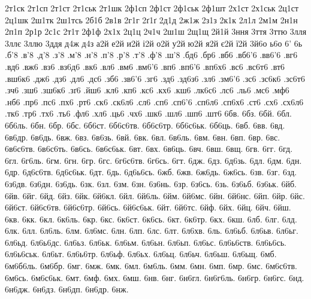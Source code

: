 {2т1ск 2т1сп 2т1ст 2т1ськ 2т1шк 2ф1сп 2ф1ст 2ф1ськ 
2ф1шт 2х1ст 2х1ськ 2ц1ст 2ц1шк 2ш1тк 2ш1тсь 
2б1б 2в1в 2г1г 2ґ1ґ 2д1д 2ж1ж 2з1з 2к1к 
2л1л 2м1м 2н1н 2п1п 2р1р 2с1с 2т1т 2ф1ф 
2х1х 2ц1ц 2ч1ч 2ш1ш 2щ1щ 2й1й 
3ння 3ття 3ттю 3лля 3ллє 3ллю 3ддя 
д4ж д4з 
а2й е2й и2й і2й о2й у2й ю2й я2й є2й ї2й 3й6о 
ь6о 6' 6ь 
.б'8 .в'8 .д'8 .з'8 .м'8 .н'8 .п'8 .р'8 
.т'8 .ф'8 .ш'8 .бд6 .бр6 .вб6 .вб6'6 .вв6'6 
.вг6 .вд6 .вж6 .вз6 .вз6д6 .вк6 .вл6 .вм6 
.вм6'6 .вп6 .вп6'6 .вп6х6 .вс6 .вс6т6 .вт6 .вш6к6 
.дж6 .дз6 .дл6 .дс6 .зб6 .зв6'6 .зг6 .зд6 
.зд6з6 .зл6 .зм6'6 .зс6 .зс6к6 .зс6т6 .зч6 .зш6 
.зш6к6 .зґ6 .йш6 .кл6 .кп6 .кс6 .кх6 .кш6 
.лк6с6 .лс6 .ль6 .мс6 .мф6 .нб6 .пр6 .пс6 
.пх6 .рт6 .ск6 .ск6л6 .сл6 .сп6 .сп6'6 .сп6л6 
.сп6х6 .ст6 .сх6 .сх6л6 .тк6 .тр6 .тх6 .ть6 
.фл6 .хл6 .ць6 .чх6 .шк6 .шл6 .шп6 .шт6 
6бв. 6бз. 6бй. 6бл. 6б6ль. 6бн. 6бр. 6бс. 
6б6ст. 6б6с6тв. 6б6с6тр. 6б6с6ьк. 6б6ць. 6вб. 6вв. 6вд. 
6в6др. 6в6дь. 6вж. 6вз. 6в6зь. 6вй. 6вк. 6вл. 
6в6ль. 6вм. 6вн. 6вп. 6вр. 6вс. 6в6с6тв. 6в6с6ть. 
6в6сь. 6в6с6ьк. 6вт. 6вх. 6в6ць. 6вч. 6вш. 6вщ. 
6гв. 6гг. 6гд. 6гл. 6г6ль. 6гм. 6гн. 6гр. 
6гс. 6г6с6тв. 6г6сь. 6гт. 6дж. 6дз. 6д6зь. 6дл. 
6дм. 6дн. 6др. 6д6с6тв. 6д6с6ьк. 6дт. 6дь. 6д6ь6сь. 
6жб. 6жв. 6ж6дь. 6ж6сь. 6зв. 6зг. 6зд. 6з6дв. 
6з6дн. 6з6дь. 6зк. 6зл. 6зм. 6зн. 6з6нь. 6зр. 
6з6сь. 6зь. 6з6ьб. 6з6ьк. 6йб. 6йв. 6йг. 6йд. 
6йз. 6йк. 6й6кл. 6йл. 6й6ль. 6йм. 6й6мс. 6йн. 
6й6нс. 6йп. 6йр. 6йс. 6й6ст. 6й6с6тв. 6й6с6тр. 6й6сь. 
6й6с6ьк. 6йт. 6й6тс. 6йф. 6йх. 6йц. 6йч. 6йш. 
6кв. 6кк. 6кл. 6к6ль. 6кр. 6кс. 6к6ст. 6к6сь. 
6кт. 6к6тр. 6кх. 6кш. 6лб. 6лг. 6лд. 6лк. 
6лл. 6л6ль. 6лм. 6л6мс. 6лн. 6лп. 6лс. 6лт. 
6л6хв. 6ль. 6л6ьб. 6л6ьв. 6л6ьг. 6л6ьд. 6л6ь6дс. 6л6ьз. 
6л6ьк. 6л6ьм. 6л6ьн. 6л6ьп. 6л6ьс. 6л6ь6ств. 6л6ь6сь. 6л6ь6ськ. 
6л6ьт. 6л6ь6тр. 6л6ьф. 6л6ьх. 6л6ьц. 6л6ьч. 6л6ьш. 6л6ьщ. 
6мб. 6м6б6ль. 6м6бр. 6мг. 6мж. 6мк. 6мл. 6м6ль. 
6мм. 6мн. 6мп. 6мр. 6мс. 6м6с6тв. 6м6сь. 6м6с6ьк. 
6мт. 6мф. 6мх. 6мш. 6нв. 6нг. 6н6гл. 6н6г6ль. 
6н6гр. 6н6гс. 6нд. 6н6дж. 6н6дз. 6н6дп. 6н6др. 6нж. 
}
